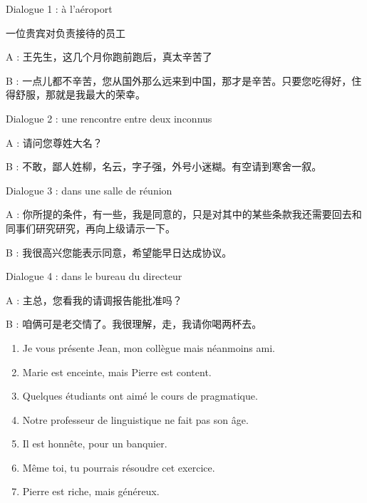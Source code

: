 \begin{keybox}
\renewcommand{\thempfootnote}{校\arabic{editorialnote}}
Dialogue 1 : à l’aéroport

一位贵宾对负责接待的员工

A : 王先生，这几个月你跑前跑后，真太辛苦了

B : 一点儿都不辛苦，您从国外那么远来到中国，那才是辛苦。只要您吃得好，住得舒服，那就是我最大的荣幸。

\medskip
Dialogue 2 : une rencontre entre deux inconnus

A : 请问您尊姓大名？

B : 不敢，鄙人姓柳，名云，字子强，外号小迷糊。有空请到寒舍一叙。

\medskip
Dialogue 3 : dans une salle de réunion

A : 你所提的条件，有一些，我是同意的，只是对其中的某些条款我还需要回去和同事们研究研究，再向上级请示一下。

B : 我很高兴您能表示同意，希望能早日达成协议。

\medskip
Dialogue 4 : dans le bureau du directeur

A : 主总，您看我的请调报告能批准吗？

B : 咱俩可是老交情了。我很理解，走，我请你喝两杯去。
\end{keybox}

\begin{keybox}
\begin{enumerate}[label=\arabic*.,leftmargin=6mm]
\item Je vous présente Jean, mon collègue mais néanmoins ami.
\item Marie est enceinte, mais Pierre est content.
\item Quelques étudiants ont aimé le cours de pragmatique.
\item Notre professeur de linguistique ne fait pas son âge.
\item Il est honnête, pour un banquier.
\item Même toi, tu pourrais résoudre cet exercice.
\item Pierre est riche, mais généreux.
\end{enumerate}
\end{keybox}

